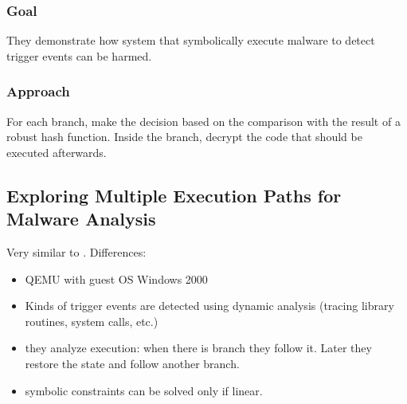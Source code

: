 \documentclass[10pt, a4paper]{article}
\begin{document}
\subsubsection{Goal}
They demonstrate how system that symbolically execute malware to detect trigger events can be harmed.

\subsubsection{Approach}
For each branch, make the decision based on the comparison with the result of a robust hash function. Inside the branch, decrypt the code that should be executed afterwards.

\subsection{\cite{MKK-SP07} Exploring Multiple Execution Paths for Malware Analysis} 

Very similar to \cite{MineSweeper-BOTNET08}. Differences:
\begin{itemize}
  \item QEMU with guest OS Windows 2000
  \item Kinds of trigger events are detected using dynamic analysis (tracing library routines, system calls, etc.)
  \item they analyze execution: when there is branch they follow it. Later they restore the state and follow another branch.
  \item symbolic constraints can be solved only if linear.
\end{itemize}

\end{document}

